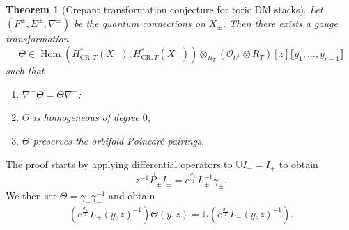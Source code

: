 \documentclass[leqno, openany]{memoir}
\newtheorem{thm}{Theorem}[section]
\theoremstyle{definition}
\theoremstyle{remark}
\theoremstyle{plain}
\theoremstyle{definition}
\theoremstyle{remark}
\newcommand{\U}{\mathbb{U}}
\newcommand{\mc}[1]{\mathcal{#1}}
\newcommand{\mr}[1]{\mathrm{#1}}
\DeclareMathOperator{\Hom}{Hom}
\begin{document}
\begin{thm}[Crepant transformation conjecture for toric DM stacks]
    Let $(F^{\pm}, E^{\pm}, \nabla^{\pm})$ be the quantum connections on $X_{\pm}$. Then there exists a gauge transformation
    \[ \Theta \in \Hom(H_{\mr{CR}, T}^*(X_-), H_{\mr{CR}, T}^*(X_+)) \otimes_{R_T} ( \mc{O}_{U^0} \otimes R_T )[z]\llbracket y_1, \ldots, y_{r-1} \rrbracket \]
    such that
    \begin{enumerate}
        \item $\nabla^+ \Theta = \Theta \nabla^-$;
        \item $\Theta$ is homogeneous of degree $0$;
        \item $\Theta$ preserves the orbifold Poincar\'e pairings.
    \end{enumerate}
\end{thm}

The proof starts by applying differential operators to $\U I_- = I_+$ to obtain
\[ z^{-1} \vec{P}_{\pm} I_{\pm} = e^{\frac{\sigma_{\pm}}{z}}L_{\pm}^{-1} \gamma_{\pm}. \]
We then set $\Theta = \gamma_+ \gamma_-^{-1}$ and obtain
\[ (e^{\frac{\sigma_+}{z}} L_+(y,z)^{-1}) \Theta(y,z) = \U (e^{\frac{\sigma_-}{z}}L_-(y,z)^{-1}). \]
\end{document}
